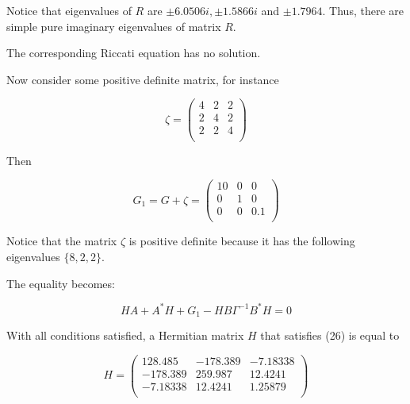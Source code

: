 \documentclass[11pt, reqno]{amsart}
\theoremstyle{plain}
\begin{document}
\noindent Notice that eigenvalues of $R$ are $\pm 6.0506i , \pm 1.5866i$ and $\pm 1.7964$. Thus, there are simple pure imaginary eigenvalues of matrix $R$. 



The corresponding Riccati equation has no solution.




 \noindent Now consider some positive definite matrix, for instance 
 
\begin{equation}
\zeta =\left(
\begin{array}{ccc}
  4 & 2 & 2 \\
 2 & 4 & 2 \\
 2 & 2 & 4 \\
\end{array}
\right)
\end{equation}  

\noindent Then 

\begin{equation} 
G_1 = G + \zeta = 
\left( 
\begin{array}{ccc}
 10 & 0 & 0 \\
 0 & 1 & 0 \\
 0 & 0 & 0.1 \\
\end{array}
\right)
\end{equation}  

\noindent Notice that the matrix $\zeta$ is positive definite because it has the following eigenvalues 
$\{ 8, 2, 2 \}$. 

The equality becomes:

\begin{equation}\label{ex} 
HA + A^{*} H + G_{1} - H B\Gamma ^{-1}B^{*}H = 0
\end{equation}



With all conditions satisfied, a Hermitian matrix $H$ that satisfies (26) is equal to 



\begin{equation}\label{H}
H=\left(
\begin{array}{ccc}
 128.485 & -178.389 & -7.18338 \\
 -178.389 & 259.987 & 12.4241 \\
 -7.18338 & 12.4241 & 1.25879 \\
\end{array}
\right)
\end{equation}
\end{document}
